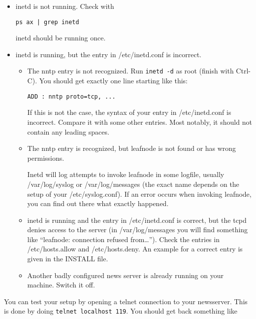 \documentclass[10pt,english,a5paper]{article}
\begin{document}
    \begin{itemize}
	\item inetd is not running. Check with
	    \begin{verbatim}
ps ax | grep inetd
\end{verbatim}
       inetd should be running once.

   \item inetd is running, but the entry in /etc/inetd.conf is incorrect.

       \begin{itemize}
	   \item The nntp entry is not recognized.
            Run \verb"inetd -d" as root (finish with Ctrl-C). You should get
            exactly one line starting like this:
	    \begin{verbatim}
ADD : nntp proto=tcp, ...
\end{verbatim}
            If this is not the case, the syntax of your entry in
            /etc/inetd.conf is incorrect. Compare it with some other
            entries. Most notably, it should not contain any leading
            spaces.

	\item The nntp entry is recognized, but leafnode is not found or
            has wrong permissions\@.

            Inetd will log attempts to invoke leafnode in some logfile,
            usually /var/log/syslog or /var/log/messages (the exact name
            depends on the setup of your /etc/syslog.conf). If an error
            occurs when invoking leafnode, you can find out there what
            exactly happened.

	\item inetd is running and the entry in /etc/inetd.conf is correct, but
       the tcpd denies access to the server (in /var/log/messages you
       will find something like ``leafnode: connection refused from\dots{}'').
       Check the entries in /etc/hosts.allow and /etc/hosts.deny. An
       example for a correct entry is given in the INSTALL file.

   \item Another badly configured news server is already running on your
       machine. Switch it off.
       \end{itemize}
       \end{itemize}

   You can test your setup by opening a telnet connection to your
   newsserver. This is done by doing \verb"telnet localhost 119". You should
   get back something like
\end{document}
